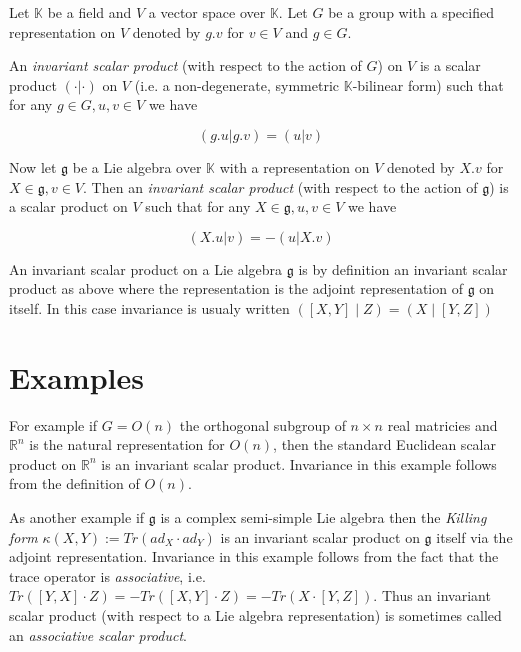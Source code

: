 \documentclass[12pt]{article}
\begin{document}
Let $\mathbb{K}$ be a field and $V$ a vector space over $\mathbb{K}$. Let $G$ be a group with a specified representation on $V$ denoted by $g . v$ for $v \in V$ and $g \in G$.

An \emph{invariant scalar product} (with respect to the action of $G$) on $V$ is a scalar product $\left( \cdot \lvert \cdot \right)$ on $V$ (i.e. a non-degenerate, symmetric $\mathbb{K}$-bilinear form) such that for any $g \in G, u,v \in V$ we have

\[ \left( g . u \lvert g . v \right) = \left( u \lvert v \right) \]

Now let $\mathfrak{g}$ be a Lie algebra over $\mathbb{K}$ with a representation on $V$ denoted by $X . v$ for $X \in \mathfrak{g}, v \in V$. Then an \emph{invariant scalar product} (with respect to the action of $\mathfrak{g}$) is a scalar product on $V$ such that for any $X \in \mathfrak{g}, u,v \in V$ we have

\[ \left( X . u \lvert v \right) =  - \left( u \lvert X . v \right) \]

An invariant scalar product on a Lie algebra $\mathfrak{g}$ is by definition an
invariant scalar product as above where the representation is the adjoint representation of $\mathfrak{g}$ on itself. In this case invariance is usualy written $\left( [X, Y] \mid Z \right) = \left( X \mid [Y, Z] \right)$

\section{Examples}

For example if $G = O(n)$ the orthogonal subgroup of $n \times n$ real matricies and $\mathbb{R}^n$ is the natural representation for $O(n)$, then the standard Euclidean scalar product on $\mathbb{R}^n$ is an invariant scalar product. Invariance in this example follows from the definition of $O(n)$.

As another example if $\mathfrak{g}$ is a complex semi-simple Lie algebra then the \emph{Killing form} $\kappa(X,Y) := Tr(ad_X \cdot ad_Y)$ is an invariant scalar product on $\mathfrak{g}$ itself via the adjoint representation. Invariance in this example follows from the fact that the trace operator is \emph{associative}, i.e. $Tr([Y,X] \cdot Z) = - Tr([X,Y] \cdot Z) = - Tr(X \cdot [Y,Z])$. Thus an invariant scalar product (with respect to a Lie algebra representation) is sometimes called an \emph{associative scalar product}.
\end{document}
